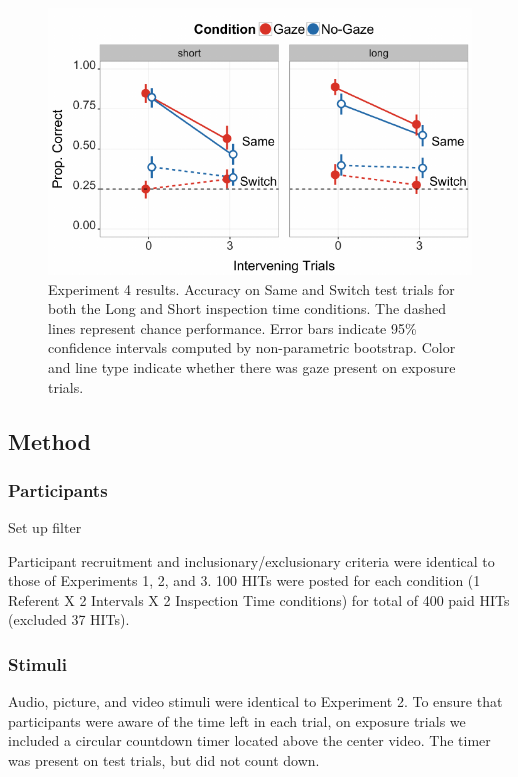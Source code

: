 \documentclass[authoryear, review]{elsarticle}
\newenvironment{CodeChunk}{}{}
\begin{document}
\begin{CodeChunk}
\begin{figure}[tb]
\includegraphics{figs/expt4-plot-1} \caption[Experiment 4 results]{Experiment 4 results. Accuracy on Same and Switch test trials for both the Long and Short inspection time conditions. The dashed lines represent chance performance. Error bars indicate 95\% confidence intervals computed by non-parametric bootstrap. Color and line type indicate whether there was gaze present on exposure trials.}\label{fig:expt4-plot}
\end{figure}
\end{CodeChunk}

\subsection{Method}\label{method-3}

\subsubsection{Participants}\label{participants-3}

Set up filter

Participant recruitment and inclusionary/exclusionary criteria were
identical to those of Experiments 1, 2, and 3. 100 HITs were posted for
each condition (1 Referent X 2 Intervals X 2 Inspection Time conditions)
for total of 400 paid HITs (excluded 37 HITs).

\subsubsection{Stimuli}\label{stimuli-2}

Audio, picture, and video stimuli were identical to Experiment 2. To
ensure that participants were aware of the time left in each trial, on
exposure trials we included a circular countdown timer located above the
center video. The timer was present on test trials, but did not count
down.
\end{document}
